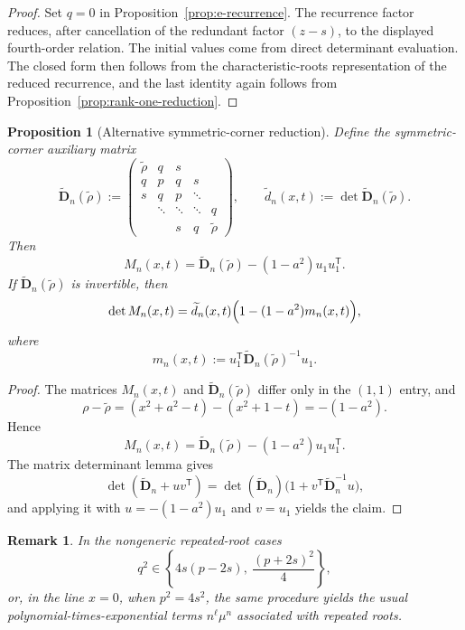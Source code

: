 \documentclass[11pt]{article}
\numberwithin{equation}{section}
\newtheorem{proposition}[theorem]{Proposition}
\newtheorem{remark}[theorem]{Remark}
\begin{document}
\begin{proof}
Set \(q=0\) in Proposition~\ref{prop:e-recurrence}.  The recurrence factor reduces,
after cancellation of the redundant factor \((z-s)\), to the displayed fourth-order
relation.  The initial values come from direct determinant evaluation.  The closed
form then follows from the characteristic-roots representation of the reduced
recurrence, and the last identity again follows from
Proposition~\ref{prop:rank-one-reduction}.
\end{proof}

\begin{proposition}[Alternative symmetric-corner reduction]
\label{prop:symmetric-corner}
Define the symmetric-corner auxiliary matrix
\[
\widetilde{\mathbf D}_n(\widetilde\rho):=
\begin{pmatrix}
\widetilde\rho & q & s \\
q & p & q & s \\
s & q & p & \ddots \\
& \ddots & \ddots & \ddots & q \\
& & s & q & \widetilde\rho
\end{pmatrix},
\qquad
\widetilde d_n(x,t):=\det \widetilde{\mathbf D}_n(\widetilde\rho).
\]
Then
\[
M_n(x,t)=\widetilde{\mathbf D}_n(\widetilde\rho)-(1-a^2)u_1u_1^{\mathsf T}.
\]
If \(\widetilde{\mathbf D}_n(\widetilde\rho)\) is invertible, then
\[
\det M_n(x,t)
=
\widetilde d_n(x,t)\Bigl(1-(1-a^2)m_n(x,t)\Bigr),
\]
where
\[
m_n(x,t):=u_1^{\mathsf T}\widetilde{\mathbf D}_n(\widetilde\rho)^{-1}u_1.
\]
\end{proposition}

\begin{proof}
The matrices \(M_n(x,t)\) and \(\widetilde{\mathbf D}_n(\widetilde\rho)\) differ only in the
\((1,1)\) entry, and
\[
\rho-\widetilde\rho=(x^2+a^2-t)-(x^2+1-t)=-(1-a^2).
\]
Hence
\[
M_n(x,t)=\widetilde{\mathbf D}_n(\widetilde\rho)-(1-a^2)u_1u_1^{\mathsf T}.
\]
The matrix determinant lemma gives
\[
\det(\widetilde{\mathbf D}_n+uv^{\mathsf T})
=
\det(\widetilde{\mathbf D}_n)\bigl(1+v^{\mathsf T}\widetilde{\mathbf D}_n^{-1}u\bigr),
\]
and applying it with \(u=-(1-a^2)u_1\) and \(v=u_1\) yields the claim.
\end{proof}

\begin{remark}
In the nongeneric repeated-root cases
\[
q^2\in\left\{4s(p-2s),\ \frac{(p+2s)^2}{4}\right\},
\]
or, in the line \(x=0\), when \(p^2=4s^2\), the same procedure yields the usual
polynomial-times-exponential terms \(n^\ell\mu^n\) associated with repeated roots.
\end{remark}
\end{document}
